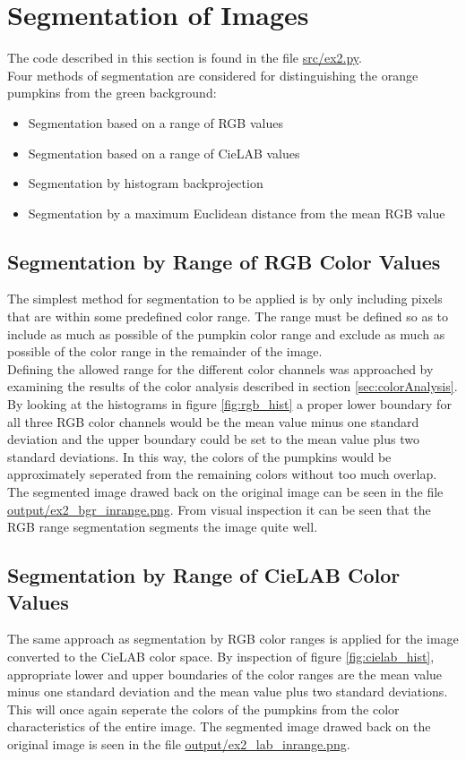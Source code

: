 \documentclass[../Head/Main.tex]{subfiles}
\begin{document}
\section{Segmentation of Images} \label{sec:seg}
The code described in this section is found in the file \url{src/ex2.py}.\\
Four methods of segmentation are considered for distinguishing the orange pumpkins from the green background:
\begin{itemize}
\item Segmentation based on a range of RGB values
\item Segmentation based on a range of CieLAB values
\item Segmentation by histogram backprojection
\item Segmentation by a maximum Euclidean distance from the mean RGB value
\end{itemize}

\subsection{Segmentation by Range of RGB Color Values}
The simplest method for segmentation to be applied is by only including pixels that are within some predefined color range. The range must be defined so as to include as much as possible of the pumpkin color range and exclude as much as possible of the color range in the remainder of the image.\\
Defining the allowed range for the different color channels was approached by examining the results of the color analysis described in section \ref{sec:colorAnalysis}. By looking at the histograms in figure \ref{fig:rgb_hist} a proper lower boundary for all three RGB color channels would be the mean value minus one standard deviation and the upper boundary could be set to the mean value plus two standard deviations. In this way, the colors of the pumpkins would be approximately seperated from the remaining colors without too much overlap.\\
The segmented image drawed back on the original image can be seen in the file \url{output/ex2_bgr_inrange.png}. From visual inspection it can be seen that the RGB range segmentation segments the image quite well. 

\subsection{Segmentation by Range of CieLAB Color Values}
The same approach as segmentation by RGB color ranges is applied for the image converted to the CieLAB color space. By inspection of figure \ref{fig:cielab_hist}, appropriate lower and upper boundaries of the color ranges are the mean value minus one standard deviation and the mean value plus two standard deviations. This will once again seperate the colors of the pumpkins from the color characteristics of the entire image. The segmented image drawed back on the original image is seen in the file \url{output/ex2_lab_inrange.png}.
\end{document}
